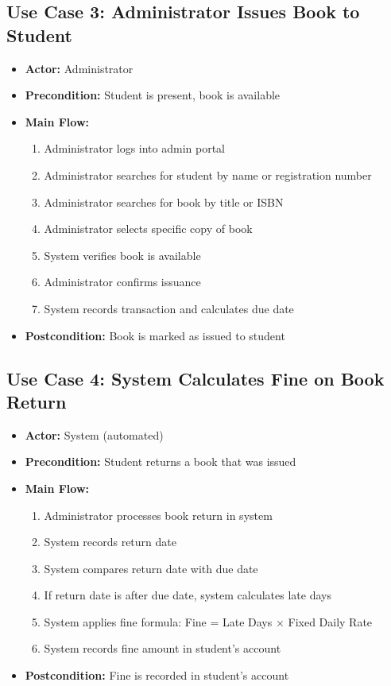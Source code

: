 \documentclass[12pt,a4paper]{report}
\begin{document}
\subsection{Use Case 3: Administrator Issues Book to Student}

\begin{itemize}
    \item \textbf{Actor:} Administrator
    \item \textbf{Precondition:} Student is present, book is available
    \item \textbf{Main Flow:}
    \begin{enumerate}
        \item Administrator logs into admin portal
        \item Administrator searches for student by name or registration number
        \item Administrator searches for book by title or ISBN
        \item Administrator selects specific copy of book
        \item System verifies book is available
        \item Administrator confirms issuance
        \item System records transaction and calculates due date
    \end{enumerate}
    \item \textbf{Postcondition:} Book is marked as issued to student
\end{itemize}

\subsection{Use Case 4: System Calculates Fine on Book Return}

\begin{itemize}
    \item \textbf{Actor:} System (automated)
    \item \textbf{Precondition:} Student returns a book that was issued
    \item \textbf{Main Flow:}
    \begin{enumerate}
        \item Administrator processes book return in system
        \item System records return date
        \item System compares return date with due date
        \item If return date is after due date, system calculates late days
        \item System applies fine formula: Fine = Late Days × Fixed Daily Rate
        \item System records fine amount in student's account
    \end{enumerate}
    \item \textbf{Postcondition:} Fine is recorded in student's account
\end{itemize}
\end{document}

